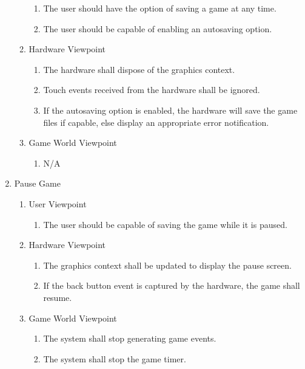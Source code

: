\documentclass[]{article}
\begin{document}
\begin{enumerate}[{BE}1.]
\begin{enumerate}[{VP2}.1]
\begin{enumerate}
				\item The user should have the option of saving a game at any time.
				\item The user should be capable of enabling an autosaving option.
			\end{enumerate}
		\item Hardware Viewpoint
			\begin{enumerate}
				\item The hardware shall dispose of the graphics context.
				\item Touch events received from the hardware shall be ignored.
				\item If the autosaving option is enabled, the hardware will save the game files if capable, else display an appropriate error notification.
			\end{enumerate}
		\item Game World Viewpoint
			\begin{enumerate}
				\item N/A
			\end{enumerate}
	\end{enumerate}
		\item Pause Game
	\begin{enumerate}[{VP3}.1]
		\item User Viewpoint
			\begin{enumerate}
				\item The user should be capable of saving the game while it is paused.
			\end{enumerate}
		\item Hardware Viewpoint
			\begin{enumerate}
				\item The graphics context shall be updated to display the pause screen.
				\item If the back button event is captured by the hardware, the game shall resume.
			\end{enumerate}
		\item Game World Viewpoint
			\begin{enumerate}
				\item The system shall stop generating game events.
				\item The system shall stop the game timer.
			\end{enumerate}
			

\end{enumerate}
\end{enumerate}
\end{document}
